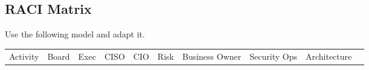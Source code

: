 \documentclass[
  letterpaper,
  DIV=11,
  numbers=noendperiod]{scrartcl}
\begin{document}
\subsection{RACI Matrix}\label{raci-matrix}

Use the following model and adapt it.

\begin{longtable}[]{@{}
  >{\raggedright\arraybackslash}p{}
  >{\raggedright\arraybackslash}p{}
  >{\raggedright\arraybackslash}p{}
  >{\raggedright\arraybackslash}p{}
  >{\raggedright\arraybackslash}p{}
  >{\raggedright\arraybackslash}p{}
  >{\raggedright\arraybackslash}p{}
  >{\raggedright\arraybackslash}p{}
  >{\raggedright\arraybackslash}p{}
  >{\raggedright\arraybackslash}p{}@{}}
\toprule\noalign{}
\begin{minipage}[b]{\linewidth}\raggedright
Activity
\end{minipage} & \begin{minipage}[b]{\linewidth}\raggedright
Board
\end{minipage} & \begin{minipage}[b]{\linewidth}\raggedright
Exec
\end{minipage} & \begin{minipage}[b]{\linewidth}\raggedright
CISO
\end{minipage} & \begin{minipage}[b]{\linewidth}\raggedright
CIO
\end{minipage} & \begin{minipage}[b]{\linewidth}\raggedright
Risk
\end{minipage} & \begin{minipage}[b]{\linewidth}\raggedright
Business Owner
\end{minipage} & \begin{minipage}[b]{\linewidth}\raggedright
Security Ops
\end{minipage} & \begin{minipage}[b]{\linewidth}\raggedright
Architecture
\end{minipage} & \begin{minipage}[b]{\linewidth}\raggedright

\end{minipage}
\end{longtable}
\end{document}
